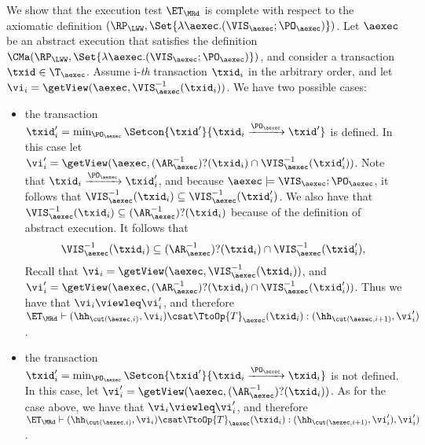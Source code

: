 We show that the execution test $\ET_{\MRd}$ is complete 
with respect to the axiomatic definition $(\RP_{\LWW}, \Set{\lambda \aexec.(\VIS_{\aexec};\PO_{\aexec})})$. 
Let $\aexec$ be an abstract execution that satisfies the definition
$\CMa(\RP_{\LWW}, \Set{\lambda \aexec.(\VIS_{\aexec};\PO_{\aexec})})$, 
and consider a transaction $\txid \in \T_{\aexec}$. 
Assume i-\emph{th} transaction \( \txid_i \) in the arbitrary order,
and let $\vi_i = \getView(\aexec, \VIS^{-1}_{\aexec}(\txid_{i}))$.
We have two possible cases: 
\begin{itemize}
    \item the transaction $\txid'_{i} = \min_{\PO_{\aexec}}\Setcon{\txid' }{ \txid_{i} \xrightarrow{\PO_{\aexec}} \txid'}$ is 
defined. In this case let $\vi'_{i} =\getView(\aexec, (\AR^{-1}_{\aexec})?(\txid_{i}) \cap \VIS^{-1}_{\aexec}(\txid'_{i}))$. 
Note that $\txid_{i} \xrightarrow{\PO_{\aexec}} \txid'_{i}$, and because $\aexec \models \VIS_{\aexec} ; \PO_{\aexec}$, 
it follows that $\VIS^{-1}_{\aexec}(\txid_{i}) \subseteq \VIS^{-1}_{\aexec}(\txid'_{i})$. 
We also have that $\VIS^{-1}_{\aexec}(\txid_{i}) \subseteq (\AR^{-1}_{\aexec})?(\txid_{i})$ because of 
the definition of abstract execution. It follows that 
\[
\VIS^{-1}_{\aexec}(\txid_{i}) \subseteq (\AR^{-1}_{\aexec})?(\txid_{i}) \cap \VIS^{-1}_{\aexec}(\txid'_{i}),
\]
Recall that  $\vi_i = \getView(\aexec, \VIS^{-1}_{\aexec}(\txid_{i}))$, 
and $\vi'_{i} =\getView(\aexec, (\AR^{-1}_{\aexec})?(\txid_{i}) \cap \VIS^{-1}_{\aexec}(\txid'_{i}))$. 
Thus we have that $\vi_i \viewleq \vi'_{i}$, and therefore $\ET_{\MRd} \vdash (\hh_{\cut(\aexec, i)}, \vi_i) 
\csat \TtoOp{T}_{\aexec}(\txid_{i}) : (\hh_{\cut(\aexec, i+1)},\vi'_{i})$. 
\item the transaction $\txid'_{i} = \min_{\PO_{\aexec}}\Setcon{\txid' }{ \txid_{i} \xrightarrow{\PO_{\aexec}} \txid_{i}}$ 
is not defined. In this case, let $\vi'_{i} = \getView(\aexec, (\AR^{-1}_{\aexec})?(\txid_{i}))$. 
As for the case above, we have that $\vi_i \viewleq \vi'_{i}$, and therefore 
$\ET_{\MRd} \vdash (\hh_{\cut(\aexec, i)}, \vi_i) \csat \TtoOp{T}_{\aexec}(\txid_{i}) : (\hh_{\cut(\aexec, i+1)},\vi'_{i}),\vi'_{i})$. 
\end{itemize}
